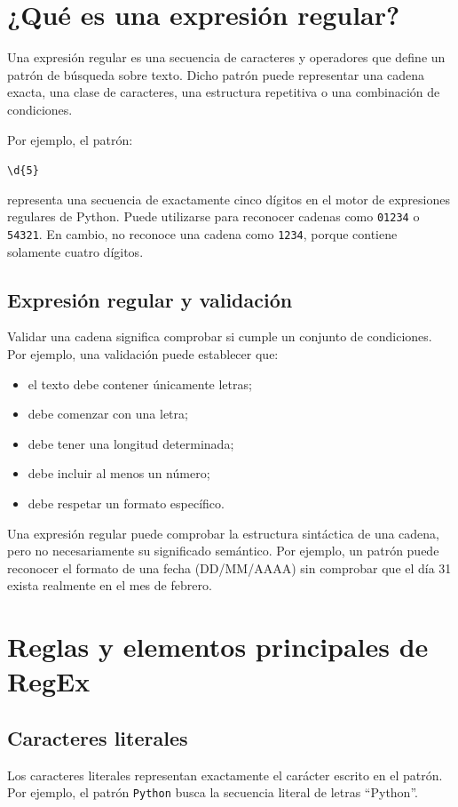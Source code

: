 \documentclass[12pt]{article}
\begin{document}
{\section{¿Qué es una expresión regular?}
Una expresión regular es una secuencia de caracteres y operadores que define un patrón de búsqueda sobre texto. Dicho patrón puede representar una cadena exacta, una clase de caracteres, una estructura repetitiva o una combinación de condiciones.

Por ejemplo, el patrón:
\begin{center}
\texttt{\textbackslash d\{5\}}
\end{center}
representa una secuencia de exactamente cinco dígitos en el motor de expresiones regulares de Python. Puede utilizarse para reconocer cadenas como \texttt{01234} o \texttt{54321}. En cambio, no reconoce una cadena como \texttt{1234}, porque contiene solamente cuatro dígitos.

\subsection{Expresión regular y validación}
Validar una cadena significa comprobar si cumple un conjunto de condiciones. Por ejemplo, una validación puede establecer que:
\begin{itemize}
\item el texto debe contener únicamente letras;
\item debe comenzar con una letra;
\item debe tener una longitud determinada;
\item debe incluir al menos un número;
\item debe respetar un formato específico.
\end{itemize}
Una expresión regular puede comprobar la estructura sintáctica de una cadena, pero no necesariamente su significado semántico. Por ejemplo, un patrón puede reconocer el formato de una fecha (DD/MM/AAAA) sin comprobar que el día 31 exista realmente en el mes de febrero.

\section{Reglas y elementos principales de RegEx}

\subsection{Caracteres literales}
Los caracteres literales representan exactamente el carácter escrito en el patrón. Por ejemplo, el patrón \texttt{Python} busca la secuencia literal de letras ``Python''.

}
\end{document}
